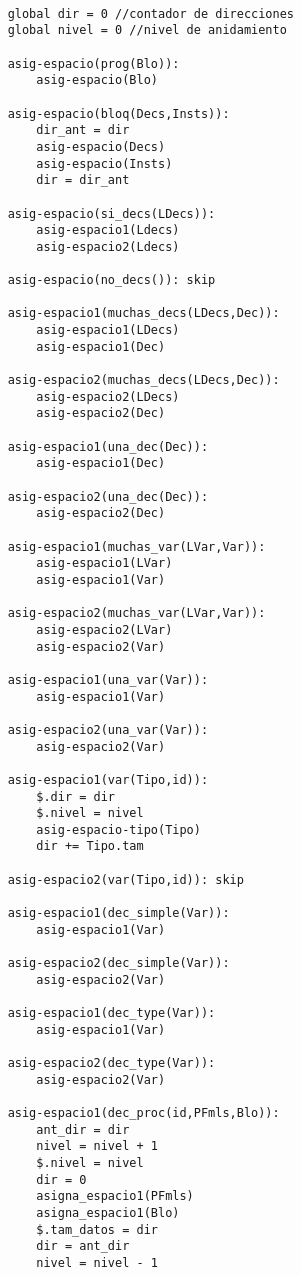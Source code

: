 \begin{lstlisting}

    global dir = 0 //contador de direcciones
    global nivel = 0 //nivel de anidamiento
    
    asig-espacio(prog(Blo)):
        asig-espacio(Blo)

    asig-espacio(bloq(Decs,Insts)):
        dir_ant = dir
        asig-espacio(Decs)
        asig-espacio(Insts)
        dir = dir_ant
    
    asig-espacio(si_decs(LDecs)):
        asig-espacio1(Ldecs)
        asig-espacio2(Ldecs)
    
    asig-espacio(no_decs()): skip
    
    asig-espacio1(muchas_decs(LDecs,Dec)):
        asig-espacio1(LDecs)
        asig-espacio1(Dec)
    
    asig-espacio2(muchas_decs(LDecs,Dec)):
        asig-espacio2(LDecs)
        asig-espacio2(Dec)
    
    asig-espacio1(una_dec(Dec)):
        asig-espacio1(Dec)

    asig-espacio2(una_dec(Dec)):
        asig-espacio2(Dec)

    asig-espacio1(muchas_var(LVar,Var)):
        asig-espacio1(LVar)
        asig-espacio1(Var)
    
    asig-espacio2(muchas_var(LVar,Var)):
        asig-espacio2(LVar)
        asig-espacio2(Var)

    asig-espacio1(una_var(Var)):
        asig-espacio1(Var)

    asig-espacio2(una_var(Var)):
        asig-espacio2(Var)
    
    asig-espacio1(var(Tipo,id)):
        $.dir = dir
        $.nivel = nivel
        asig-espacio-tipo(Tipo)
        dir += Tipo.tam

    asig-espacio2(var(Tipo,id)): skip
    
    asig-espacio1(dec_simple(Var)):
        asig-espacio1(Var)

    asig-espacio2(dec_simple(Var)):
        asig-espacio2(Var)

    asig-espacio1(dec_type(Var)):
        asig-espacio1(Var)

    asig-espacio2(dec_type(Var)):
        asig-espacio2(Var)
    
    asig-espacio1(dec_proc(id,PFmls,Blo)):
        ant_dir = dir 
        nivel = nivel + 1
        $.nivel = nivel
        dir = 0 
        asigna_espacio1(PFmls)
        asigna_espacio1(Blo)
        $.tam_datos = dir 
        dir = ant_dir 
        nivel = nivel - 1 
        


\end{lstlisting}
